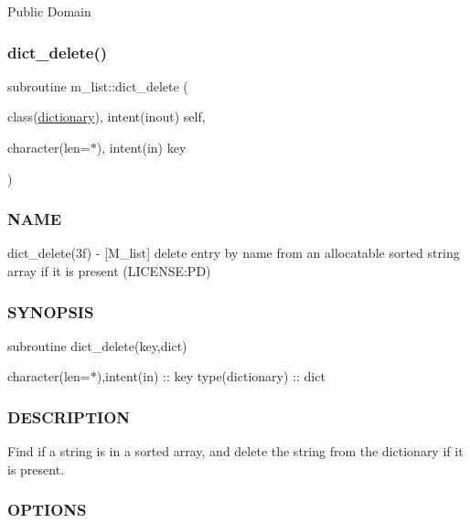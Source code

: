 Public Domain \mbox{\label{namespacem__list_aa562d18ce6890a8a1a96d77ff1d39948}} 
\subsubsection{\texorpdfstring{dict\+\_\+delete()}{dict\_delete()}}
{\footnotesize\ttfamily subroutine m\+\_\+list\+::dict\+\_\+delete (\begin{DoxyParamCaption}\item[{class(\mbox{\hyperlink{structm__list_1_1dictionary}{dictionary}}), intent(inout)}]{self,  }\item[{character(len=$\ast$), intent(in)}]{key }\end{DoxyParamCaption})\hspace{0.3cm}{\ttfamily [private]}}



\subsubsection*{N\+A\+ME}

dict\+\_\+delete(3f) -\/ \mbox{[}M\+\_\+list\mbox{]} delete entry by name from an allocatable sorted string array if it is present (L\+I\+C\+E\+N\+SE\+:PD) 

\subsubsection*{S\+Y\+N\+O\+P\+S\+IS}

subroutine dict\+\_\+delete(key,dict)

character(len=$\ast$),intent(in) \+:\+: key type(dictionary) \+:\+: dict

\subsubsection*{D\+E\+S\+C\+R\+I\+P\+T\+I\+ON}

\begin{DoxyVerb}Find if a string is in a sorted array, and delete the string
from the dictionary if it is present.
\end{DoxyVerb}


\subsubsection*{O\+P\+T\+I\+O\+NS}

